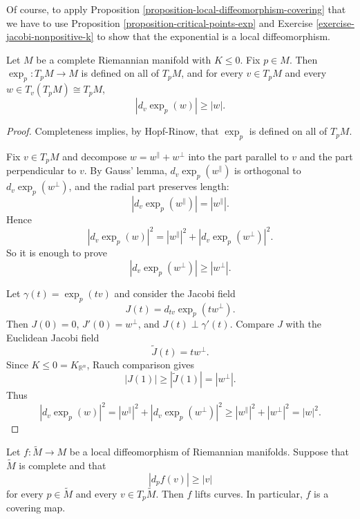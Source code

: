 Of course,
to apply 
Proposition
\ref{proposition-local-diffeomorphism-covering}
that we have to use
Proposition
\ref{proposition-critical-points-exp}
and
Exercise \ref{exercise-jacobi-nonpositive-k}
to show that the exponential is a local
diffeomorphism.

\begin{proposition}
\label{proposition-exp-nonpositive-curvature-expanding}
Let $M$ be a complete Riemannian manifold
with $K\leq 0$. Fix $p\in M$. Then
$\exp_p:T_pM\to M$ is defined on all of
$T_pM$, and for every $v\in T_pM$ and every
$w\in T_v(T_pM)\cong T_pM$,
$$
|d_v\exp_p(w)|\geq |w|.
$$
\end{proposition}

\begin{proof}
Completeness implies, by Hopf-Rinow, that
$\exp_p$ is defined on all of $T_pM$.

Fix $v\in T_pM$ and decompose
$w=w^\parallel+w^\perp$ into the part
parallel to $v$ and the part perpendicular to
$v$. By Gauss' lemma,
$d_v\exp_p(w^\parallel)$ is orthogonal to
$d_v\exp_p(w^\perp)$, and the radial part
preserves length:
$$
|d_v\exp_p(w^\parallel)|=|w^\parallel|.
$$
Hence
$$
|d_v\exp_p(w)|^2=
|w^\parallel|^2+
|d_v\exp_p(w^\perp)|^2.
$$
So it is enough to prove
$$
|d_v\exp_p(w^\perp)|\geq |w^\perp|.
$$

Let $\gamma(t)=\exp_p(tv)$ and consider the
Jacobi field
$$
J(t)=d_{tv}\exp_p(tw^\perp).
$$
Then $J(0)=0$, $J'(0)=w^\perp$, and
$J(t)\perp\gamma'(t)$. Compare $J$ with the
Euclidean Jacobi field
$$
\tilde{J}(t)=tw^\perp.
$$
Since $K\leq 0=K_{\mathbb{R}^n}$, Rauch
comparison gives
$$
|J(1)|\geq |\tilde{J}(1)|
=|w^\perp|.
$$
Thus
$$
|d_v\exp_p(w)|^2
=
|w^\parallel|^2+
|d_v\exp_p(w^\perp)|^2
\geq
|w^\parallel|^2+|w^\perp|^2
=
|w|^2.
$$
\end{proof}

\begin{proposition}
\label{proposition-local-diffeomorphism-covering}
\begin{reference}
\cite[Chapter VII, Lemma 3.3]{doc}
\end{reference}
Let $f:\tilde M\to M$ be a local
diffeomorphism of Riemannian manifolds.
Suppose that $\tilde M$ is complete and that
$$
|d_pf(v)|\geq |v|
$$
for every $p\in\tilde M$ and every
$v\in T_p\tilde M$. Then $f$ lifts curves.
In particular, $f$ is a covering map.
\end{proposition}


